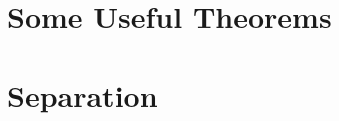 \documentclass[12pt]{article}
\begin{document}

\section{Some Useful Theorems}


\section{Separation}


\clearpage

%
%
%
%
% 
%
% 
\end{document}
